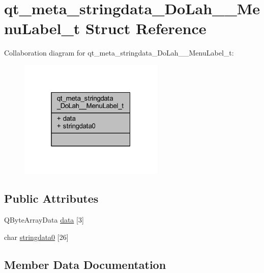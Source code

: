 \hypertarget{structqt__meta__stringdata___do_lah_____menu_label__t}{}\section{qt\+\_\+meta\+\_\+stringdata\+\_\+\+Do\+Lah\+\_\+\+\_\+\+Menu\+Label\+\_\+t Struct Reference}
\label{structqt__meta__stringdata___do_lah_____menu_label__t}


Collaboration diagram for qt\+\_\+meta\+\_\+stringdata\+\_\+\+Do\+Lah\+\_\+\+\_\+\+Menu\+Label\+\_\+t\+:\nopagebreak
\begin{figure}[H]
\begin{center}
\leavevmode
\includegraphics[width=196pt]{structqt__meta__stringdata___do_lah_____menu_label__t__coll__graph}
\end{center}
\end{figure}
\subsection*{Public Attributes}
\begin{DoxyCompactItemize}
\item 
Q\+Byte\+Array\+Data \hyperlink{structqt__meta__stringdata___do_lah_____menu_label__t_a0f6e95f52f5aa30e5ef7a60b5911c0dd}{data} \mbox{[}3\mbox{]}
\item 
char \hyperlink{structqt__meta__stringdata___do_lah_____menu_label__t_ae04ad799c51cb48c3194c52c81948fe9}{stringdata0} \mbox{[}26\mbox{]}
\end{DoxyCompactItemize}


\subsection{Member Data Documentation}
\hypertarget{structqt__meta__stringdata___do_lah_____menu_label__t_a0f6e95f52f5aa30e5ef7a60b5911c0dd}{}
